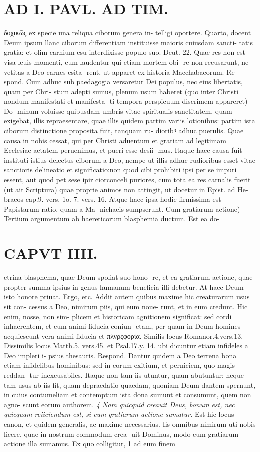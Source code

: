 \documentclass{article}
\begin{document}
\begin{pages}
\section*{AD I. PAVL. AD TIM. }
\marginpar{[ p.194 ]}δοχικῶς ex specie una reliqua ciborum genera in- telligi oportere. Quarto, docent Deum ipsum llanc ciborum differentiam instituisse maioris cuiusdam sancti- tatis gratia: et olim carnium esu interdixisse populo suo. Deut. 22. Quae res non est visa leuis momenti, cum laudentur qui etiam mortem obi- re non recusarunt, ne vetitas a Deo carnes esita- rent, ut apparet ex historia Macchabaeorum. Re- spond. Cum adhuc sub paedagogia versaretur Dei populus, nec eius libertatis, quam per Chri- stum adepti sumus, plenum usum haberet (quo inter Christi nondum manifestati et manifesta- ti tempora perspicuum discrimem appareret) Do- minum voluisse quibusdam umbris vitae spiritualis sanctitatem, quam exigebat, illis repraesentare, quae illis quidem partim variis lotionibus: partim ista ciborum distinctione proposita fuit, tanquam ru- dioribꝰ adhuc puerulis. Quae causa in nobis cessat, qui per Christi aduentum et gratiam ad legitimam Ecclesiae aetatem peruenimus, et pueri esse desii- mus. Itaque haec causa fuit instituti istius delectus ciborum a Deo, nempe ut illis adhuc rudioribus esset vitae sanctioris delineatio et significatio:non quod cibi prohibiti ipsi per se impuri essent, aut quod pet sese ipir ciorconceli puriores, cum tota ea res carnalis fuerit (ut ait Scriptura) quae proprie animos non attingit, ut docetur in Epist. ad He- braeos cap.9. vers. 1o. 7. vers. 16. Atque haec ipsa hodie firmissima est Papistarum ratio, quam a Ma- nichaeis sumpserunt. Cum gratiarum actione) Tertium argumentum ab haereticorum blasphemia ductum. Est ea do- 
\section*{CAPVT  IIII. }
\marginpar{[ p.195 ]}ctrina blasphema, quae Deum spoliat suo hono- re, et ea gratiarum actione, quae propter summa ipsius in genus humanum beneficia illi debetur. At haec Deum isto honore priuat. Ergo, etc. Addit autem quibus maxime hic creaturarum usus sit con- cessus a Deo, nimirum piis, qui eum noue- runt, et in eum credunt. Hic enim, nosse, non sim- plicem et historicam agnitionem significat: sed cordi inhaerentem, et cum animi fiducia coniun- ctam, per quam in Deum homines acquiescunt vera animi fiducia et πλνρςφορία. Similis locus Romanor.4.vers.13. Dissimilis locus Matth.5. vers.45. et Psal.17.y. 14. ubi dicuntur etiam infideles a Deo impleri i- psius thesauris. Respond. Dantur quidem a Deo terrena bona etiam infidelibus hominibus: sed in eorum exitium, et perniciem, quo magis reddan- tur inexcusabiles. Itaque non tam iis utuntur, quam abutuntur: neque tam usus ab iis fit, quam depraedatio quaedam, quoniam Deum dantem spernunt, in cuius contumeliam et contemptum ista dona sumunt et consumunt, quem non agno- scunt eorum authorem. \textit{4 Nam quicquid creauit Deus, bonum} \textit{est, nec quicquam reiiciendum est, si cum} \textit{gratiarum actione sumatur.} Est hic locus canon, et quidem generalis, ac maxime necessarius. Iis omnibus nimirum uti nobis licere, quae in nostrum commodum crea- uit Dominus, modo cum gratiarum actione illa sumamus. Ex quo colligitur, 1 ad eum finem 

\end{pages}
\end{document}
